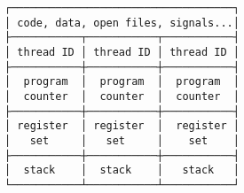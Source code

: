 \documentclass[varwidth,crop]{standalone}
\begin{document}
\begin{verbatim}
┌───────────────────────────────────┐
│ code, data, open files, signals...│
├───────────┬───────────┬───────────┤
│ thread ID │ thread ID │ thread ID │
├───────────┼───────────┼───────────┤
│  program  │  program  │  program  │
│  counter  │  counter  │  counter  │
├───────────┼───────────┼───────────┤
│ register  │ register  │  register │
│   set     │   set     │    set    │
├───────────┼───────────┼───────────┤
│  stack    │  stack    │   stack   │
└───────────┴───────────┴───────────┘
\end{verbatim}
\end{document}
